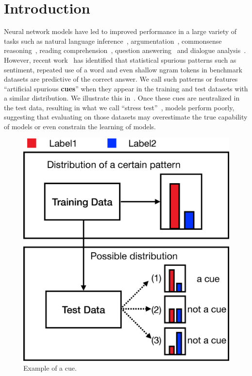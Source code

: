 \section{Introduction}
\label{sec:intro}
Neural network models have led to improved performance 
in a large variety of tasks
such as natural language inference~\cite{bowman2015large,wang2018glue}, 
argumentation~\cite{niven2019probing}, commonsense
reasoning~\cite{mostafazadeh2016corpus,roemmele2011choice,zellers2018swag}, 
reading comprehension~\cite{lai2017race}, question answering~\cite{talmor2019commonsenseqa} 
and dialogue analysis~\cite{lowe2015ubuntu}. 
However, recent work~\cite{gururangan2018annotation,sanchez2018behavior,poliak2018hypothesis}
has identified that statistical spurious patterns such as sentiment, repeated use of
a word and even shallow ngram tokens in benchmark datasets 
are predictive of the correct answer. 
We call such patterns or features ``artificial spurious \textbf{cues}'' when
they appear in the training and test datasets with a similar distribution.
We illustrate this in~. 
Once these cues are neutralized in 
the test data, resulting in what we call 
``stress test''~\cite{naik2018stress,mccoy2019right,Marco2020acl}, 
models perform poorly, suggesting 
that evaluating on those datasets may overestimate the true capability of 
models or even constrain the learning  of models. 

\begin{figure}[th]
\centering
\includegraphics[width=0.6\columnwidth]{picture/cue_def.eps}
\caption{Example of a cue.}
\label{fig:cue_def}
\end{figure}


